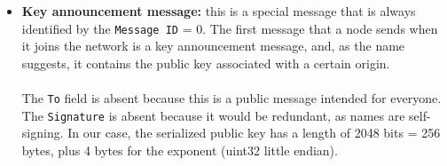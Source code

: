 \documentclass[a4paper,12pt]{article}
\begin{document}
\begin{itemize}
\item \textbf{Key announcement message:} this is a special message that is always identified by the \texttt{Message ID} = 0. The first message that a node sends when it joins the network is a key announcement message, and, as the name suggests, it contains the public key associated with a certain origin.\\
{
	\centering
	\vspace{2mm}
}\\
The \texttt{To} field is absent because this is a public message intended for everyone. The \texttt{Signature} is absent because it would be redundant, as names are self-signing. In our case, the serialized public key has a length of 2048 bits = 256 bytes, plus 4 bytes for the exponent (uint32 little endian).


\end{itemize}
\end{document}
